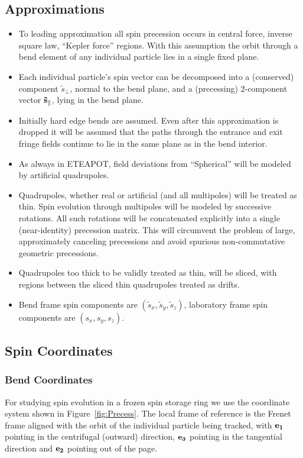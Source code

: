 \documentclass[]{article}
\begin{document}
\subsection{Approximations}
%
\begin{itemize}
\item
To leading approximation all spin precession occurs in central force,
inverse square law, ``Kepler force'' regions. With this assumption
the orbit through a bend element of any individual particle lies in
a single fixed plane. 
\item
Each individual particle's spin vector can be decomposed
into a (conserved) component $\tilde s_{\perp}$, normal to the bend plane, 
and a (precessing) 2-component vector ${\bf \tilde s_{\parallel}}$, 
lying in the bend plane.
\item
Initially hard edge bends are assumed. Even after this approximation is
dropped it will be assumed that the paths through the entrance and exit
fringe fields continue to lie in the same plane as in the bend interior.
\item
As always in ETEAPOT, field deviations from ``Spherical'' will be modeled by
artificial quadrupoles.
\item
Quadrupoles, whether real or artificial (and all multipoles) will be 
treated as thin. Spin evolution through multipoles will be modeled by 
successive rotations. All such rotations
will be concatenated explicitly into a single (near-identity) precession
matrix. This will circumvent the problem of large, approximately canceling
precessions and avoid spurious non-commutative geometric precessions.
\item
Quadrupoles too thick to be validly treated as thin, will be sliced, with
regions between the sliced thin quadrupoles treated as drifts.
\item
Bend frame spin components are $(\tilde s_x,\tilde s_y,\tilde s_z)$, laboratory
frame spin components are  $(s_x,s_y,s_z)$.
\end{itemize}
%

\subsection{Spin Coordinates}
\subsubsection{Bend Coordinates}
For studying spin evolution
in a frozen spin storage ring we
use the coordinate system shown in Figure~\ref{fig:Precess}.
The local frame of reference is the Frenet frame
aligned with the orbit of the individual particle being
tracked, with ${\bf e_1}$
pointing in the centrifugal (outward) direction, 
${\bf e_3}$ pointing in the tangential direction
and ${\bf e_2}$ pointing out of the page.
\end{document}
